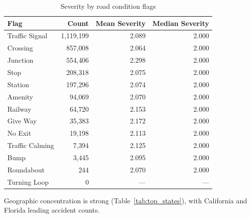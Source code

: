 \documentclass[11pt]{article}
\begin{document}
\begin{table}[H]
    \centering
    \caption{Severity by road condition flags}
    \label{tab:road_flags}
    \begin{tabular}{lrrr}
        \toprule
        Flag            & Count         & Mean Severity & Median Severity \\
        \midrule
        Traffic Signal  & 1{,}119{,}199 & 2.089         & 2.000           \\
        Crossing        & 857{,}008     & 2.064         & 2.000           \\
        Junction        & 554{,}406     & 2.298         & 2.000           \\
        Stop            & 208{,}318     & 2.075         & 2.000           \\
        Station         & 197{,}296     & 2.074         & 2.000           \\
        Amenity         & 94{,}069      & 2.070         & 2.000           \\
        Railway         & 64{,}720      & 2.153         & 2.000           \\
        Give Way        & 35{,}383      & 2.172         & 2.000           \\
        No Exit         & 19{,}198      & 2.113         & 2.000           \\
        Traffic Calming & 7{,}394       & 2.125         & 2.000           \\
        Bump            & 3{,}445       & 2.095         & 2.000           \\
        Roundabout      & 244           & 2.070         & 2.000           \\
        Turning Loop    & 0             & ---           & ---             \\
        \bottomrule
    \end{tabular}
\end{table}

Geographic concentration is strong (Table~\ref{tab:top_states}), with California and Florida leading accident counts.
\end{document}

